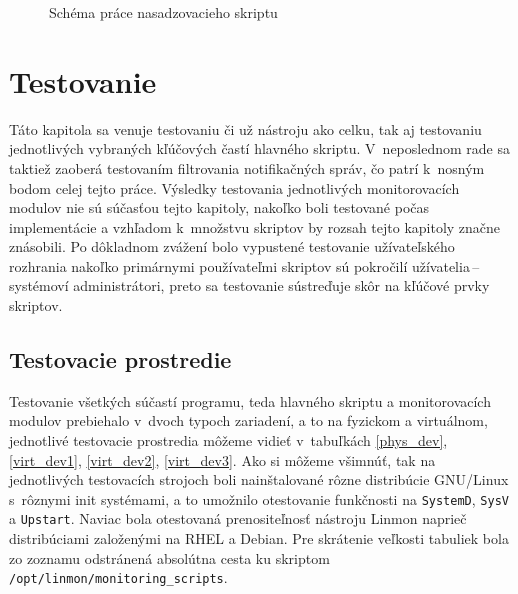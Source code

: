 \begin{figure}[H]
	\begin{center}
		\vspace{-1em}
		\caption{Schéma práce nasadzovacieho skriptu}
		\label{fabric_schema}
	\end{center}
\end{figure} 

\chapter{Testovanie}
\label{testovanie}
Táto kapitola sa venuje testovaniu či už nástroju ako celku, tak aj testovaniu jednotlivých vybraných kľúčových častí hlavného skriptu. V~neposlednom rade sa taktiež zaoberá testovaním filtrovania notifikačných správ, čo patrí k~nosným bodom celej tejto práce. Výsledky testovania jednotlivých monitorovacích modulov nie sú súčasťou tejto kapitoly, nakoľko boli testované počas implementácie a vzhľadom k~množstvu skriptov by rozsah tejto kapitoly značne znásobili. Po dôkladnom zvážení bolo vypustené testovanie užívateľského rozhrania nakoľko primárnymi používateľmi skriptov sú pokročilí užívatelia\,--\,systémoví administrátori, preto sa testovanie sústreďuje skôr na kľúčové prvky skriptov. 

\section{Testovacie prostredie}
Testovanie všetkých súčastí programu, teda hlavného skriptu a monitorovacích modulov prebiehalo v~dvoch typoch zariadení, a to na fyzickom a virtuálnom, jednotlivé testovacie prostredia môžeme vidieť v~tabuľkách \ref{phys_dev}, \ref{virt_dev1}, \ref{virt_dev2}, \ref{virt_dev3}. Ako si môžeme všimnúť, tak na jednotlivých testovacích strojoch boli nainštalované rôzne distribúcie GNU/Linux s~rôznymi init systémami, a to umožnilo otestovanie funkčnosti na \texttt{SystemD}, \texttt{SysV} a \texttt{Upstart}. Naviac bola otestovaná prenositeľnosť nástroju Linmon naprieč distribúciami založenými na RHEL a Debian. Pre skrátenie veľkosti tabuliek bola zo zoznamu odstránená absolútna cesta ku skriptom \texttt{/opt/linmon/monitoring\_scripts}.


